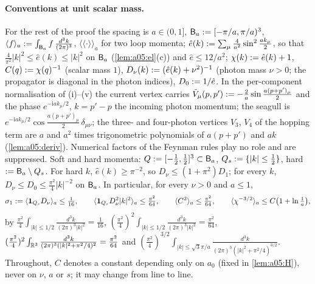 \paragraph{Conventions at unit scalar mass.} For the rest of the proof the spacing is $a\in(0,1]$, $\mathsf B_a:=[-\pi/a,\pi/a)^3$, $\langle f\rangle_a:=\int_{\mathsf B_a}f\,\frac{d^3k}{(2\pi)^3}$, $\langle\langle\cdot\rangle\rangle_a$ for two loop momenta; $\hat e(k):=\sum_\mu\frac4{a^2}\sin^2\frac{ak_\mu}2$, so that $\frac4{\pi^2}|k|^2\le\hat e(k)\le|k|^2$ on $\mathsf B_a$ (\cref{lem:a05:el}(c)) and $\hat e\le12/a^2$; $\chi(k):=\hat e(k)+1$, $C(q):=\chi(q)^{-1}$ (scalar mass $1$), $D_\nu(k):=(\hat e(k)+\nu^2)^{-1}$ (photon mass $\nu>0$; the propagator is diagonal in the photon indices), $D_0:=1/\hat e$. In the per-component normalisation of (i)--(v) the current vertex carries $\tilde V_\mu(p,p'):=-\frac2a\sin\frac{a(p+p')_\mu}2$ and the phase $e^{-\mathrm iak_\mu/2}$, $k=p'-p$ the incoming photon momentum; the seagull is $e^{-\mathrm iak_\mu/2}\cos\frac{a(p+p')_\mu}2\,\delta_{\mu\nu}$; the three- and four-photon vertices $V_3$, $V_4$ of the hopping term are $a$ and $a^2$ times trigonometric polynomials of $a(p+p')$ and $ak$ (\cref{lem:a05:deriv}). Numerical factors of the Feynman rules play no role and are suppressed. Soft and hard momenta: $Q:=[-\frac12,\frac12]^3\subset\mathsf B_a$, $Q_s:=\{|k|\le\frac12\}$, hard $:=\mathsf B_a\setminus Q_s$. For hard $k$, $\hat e(k)\ge\pi^{-2}$, so $D_\nu\le(1+\pi^2)D_1$; for every $k$, $D_\nu\le D_0\le\frac{\pi^2}4|k|^{-2}$ on $\mathsf B_a$. In particular, for every $\nu>0$ and $a\le1$,
\begin{equation}\label{eq:a05:soft}
\sigma_1:=\langle\mathbf 1_{Q_s}D_\nu\rangle_a\le\tfrac1{16},\qquad\langle\mathbf 1_{Q_s}D_\nu^2|k|^2\rangle_a\le\tfrac{\pi^2}{64},\qquad\langle C^2\rangle_a\le\tfrac{\pi^2}{64},\qquad\langle\chi^{-3/2}\rangle_a\le C\big(1+\ln\tfrac1a\big),
\end{equation}
by $\frac{\pi^2}4\int_{|k|\le1/2}\frac{d^3k}{(2\pi)^3|k|^2}=\frac1{16}$, $(\frac{\pi^2}4)^2\int_{|k|\le1/2}\frac{d^3k}{(2\pi)^3|k|^2}=\frac{\pi^2}{64}$, $(\frac{\pi^2}4)^2\int_{\mathbb R^3}\frac{d^3k}{(2\pi)^3(|k|^2+\pi^2/4)^2}=\frac{\pi^2}{64}$ and $(\frac{\pi^2}4)^{3/2}\int_{|k|\le\sqrt3\pi/a}\frac{d^3k}{(2\pi)^3(|k|^2+\pi^2/4)^{3/2}}$. Throughout, $C$ denotes a constant depending only on $a_0$ (fixed in \cref{lem:a05:H}), never on $\nu$, $a$ or $s$; it may change from line to line.

